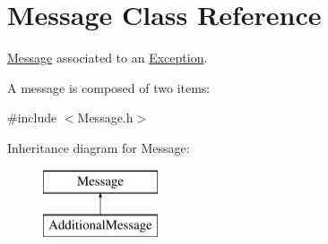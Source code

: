 \hypertarget{class_message}{}\section{Message Class Reference}
\label{class_message}


\hyperlink{class_message}{Message} associated to an \hyperlink{class_exception}{Exception}.

A message is composed of two items\+:  




{\ttfamily \#include $<$Message.\+h$>$}

Inheritance diagram for Message\+:\begin{figure}[H]
\begin{center}
\leavevmode
\includegraphics[height=2.000000cm]{class_message}
\end{center}
\end{figure}
